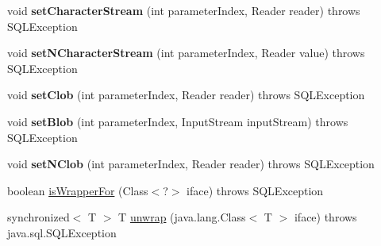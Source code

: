 \begin{DoxyCompactItemize}
\mbox{\label{classcom_1_1mysql_1_1jdbc_1_1jdbc2_1_1optional_1_1_j_d_b_c4_callable_statement_wrapper_aab3c34d3377c27773f1d0cdbdd9555d9}} 
void {\bfseries set\+Character\+Stream} (int parameter\+Index, Reader reader)  throws S\+Q\+L\+Exception 
\item 
\mbox{\label{classcom_1_1mysql_1_1jdbc_1_1jdbc2_1_1optional_1_1_j_d_b_c4_callable_statement_wrapper_a3600aff39e40a24665979ad8f0fce924}} 
void {\bfseries set\+N\+Character\+Stream} (int parameter\+Index, Reader value)  throws S\+Q\+L\+Exception 
\item 
\mbox{\label{classcom_1_1mysql_1_1jdbc_1_1jdbc2_1_1optional_1_1_j_d_b_c4_callable_statement_wrapper_acf68b38ec7b50a1b1f2742f6dd1de093}} 
void {\bfseries set\+Clob} (int parameter\+Index, Reader reader)  throws S\+Q\+L\+Exception 
\item 
\mbox{\label{classcom_1_1mysql_1_1jdbc_1_1jdbc2_1_1optional_1_1_j_d_b_c4_callable_statement_wrapper_a3194ed52f267b3ec30ba4d74082fd079}} 
void {\bfseries set\+Blob} (int parameter\+Index, Input\+Stream input\+Stream)  throws S\+Q\+L\+Exception 
\item 
\mbox{\label{classcom_1_1mysql_1_1jdbc_1_1jdbc2_1_1optional_1_1_j_d_b_c4_callable_statement_wrapper_aa4180d4d6b0a60c4982d4d314049be82}} 
void {\bfseries set\+N\+Clob} (int parameter\+Index, Reader reader)  throws S\+Q\+L\+Exception 
\item 
boolean \mbox{\hyperlink{classcom_1_1mysql_1_1jdbc_1_1jdbc2_1_1optional_1_1_j_d_b_c4_callable_statement_wrapper_aef8020358ca3802114c61365720723b5}{is\+Wrapper\+For}} (Class$<$?$>$ iface)  throws S\+Q\+L\+Exception 
\item 
synchronized$<$ T $>$ T \mbox{\hyperlink{classcom_1_1mysql_1_1jdbc_1_1jdbc2_1_1optional_1_1_j_d_b_c4_callable_statement_wrapper_a7538139197ca44db6cc1f29a517207bb}{unwrap}} (java.\+lang.\+Class$<$ T $>$ iface)  throws java.\+sql.\+S\+Q\+L\+Exception 

\end{DoxyCompactItemize}
